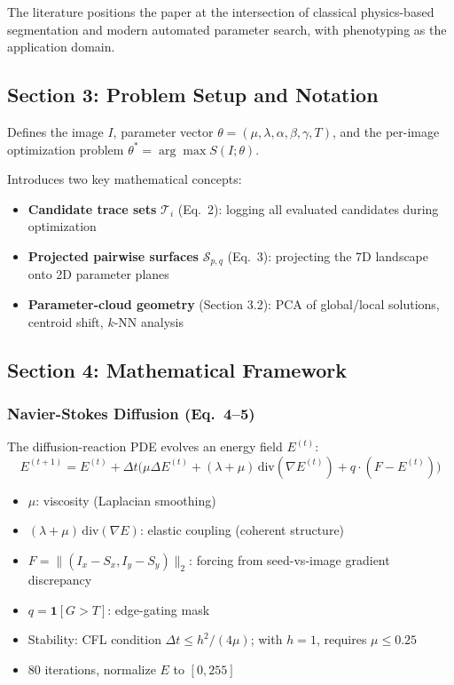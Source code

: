 \documentclass[11pt,a4paper]{article}
\begin{document}
The literature positions the paper at the intersection of classical physics-based segmentation and modern automated parameter search, with phenotyping as the application domain.

\subsection{Section 3: Problem Setup and Notation}
Defines the image $I$, parameter vector $\theta = (\mu, \lambda, \alpha, \beta, \gamma, T)$, and the per-image optimization problem $\theta^* = \arg\max S(I;\theta)$.

Introduces two key mathematical concepts:
\begin{itemize}[nosep]
  \item \textbf{Candidate trace sets} $\mathcal{T}_i$ (Eq.~2): logging all evaluated candidates during optimization
  \item \textbf{Projected pairwise surfaces} $\mathcal{S}_{p,q}$ (Eq.~3): projecting the 7D landscape onto 2D parameter planes
  \item \textbf{Parameter-cloud geometry} (Section 3.2): PCA of global/local solutions, centroid shift, $k$-NN analysis
\end{itemize}

\subsection{Section 4: Mathematical Framework}

\subsubsection{Navier-Stokes Diffusion (Eq.~4--5)}
The diffusion-reaction PDE evolves an energy field $E^{(t)}$:
\[
E^{(t+1)} = E^{(t)} + \Delta t \Big( \mu \Delta E^{(t)} + (\lambda+\mu)\,\mathrm{div}(\nabla E^{(t)}) + q \cdot (F - E^{(t)}) \Big)
\]
\begin{itemize}[nosep]
  \item $\mu$: viscosity (Laplacian smoothing)
  \item $(\lambda+\mu)\,\mathrm{div}(\nabla E)$: elastic coupling (coherent structure)
  \item $F = \|(I_x - S_x, I_y - S_y)\|_2$: forcing from seed-vs-image gradient discrepancy
  \item $q = \mathbf{1}[G > T]$: edge-gating mask
  \item Stability: CFL condition $\Delta t \leq h^2/(4\mu)$; with $h=1$, requires $\mu \leq 0.25$
  \item 80 iterations, normalize $E$ to $[0,255]$
\end{itemize}
\end{document}
